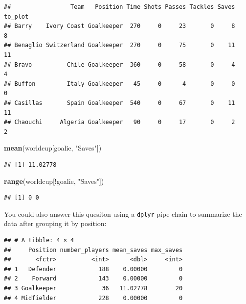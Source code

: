 \documentclass[]{book}
\makeatletter
\newenvironment{Shaded}{\begin{snugshade}}{\end{snugshade}}
\newcommand{\KeywordTok}[1]{\textcolor[rgb]{0.13,0.29,0.53}{\textbf{{#1}}}}
\newcommand{\DataTypeTok}[1]{\textcolor[rgb]{0.13,0.29,0.53}{{#1}}}
\newcommand{\StringTok}[1]{\textcolor[rgb]{0.31,0.60,0.02}{{#1}}}
\newcommand{\NormalTok}[1]{{#1}}
\newenvironment{kframe}{%
\medskip{}
\setlength{\fboxsep}{.8em}
 \def\at@end@of@kframe{}%
 \ifinner\ifhmode%
  \def\at@end@of@kframe{\end{minipage}}%
  \begin{minipage}{\columnwidth}%
 \fi\fi%
 \def\FrameCommand##1{\hskip\@totalleftmargin \hskip-\fboxsep
 \colorbox{shadecolor}{##1}\hskip-\fboxsep
     \hskip-\linewidth \hskip-\@totalleftmargin \hskip\columnwidth}%
 \MakeFramed {\advance\hsize-\width
   \@totalleftmargin\z@ \linewidth\hsize
   \@setminipage}}%
 {\par\unskip\endMakeFramed%
 \at@end@of@kframe}
\renewenvironment{Shaded}{\begin{kframe}}{\end{kframe}}
\makeatother
\begin{document}
\begin{verbatim}
##                 Team   Position Time Shots Passes Tackles Saves to_plot
## Barry    Ivory Coast Goalkeeper  270     0     23       0     8       8
## Benaglio Switzerland Goalkeeper  270     0     75       0    11      11
## Bravo          Chile Goalkeeper  360     0     58       0     4       4
## Buffon         Italy Goalkeeper   45     0      4       0     0       0
## Casillas       Spain Goalkeeper  540     0     67       0    11      11
## Chaouchi     Algeria Goalkeeper   90     0     17       0     2       2
\end{verbatim}

\begin{Shaded}
\begin{Highlighting}[]
\KeywordTok{mean}\NormalTok{(worldcup[goalie, }\StringTok{"Saves"}\NormalTok{])}
\end{Highlighting}
\end{Shaded}

\begin{verbatim}
## [1] 11.02778
\end{verbatim}

\begin{Shaded}
\begin{Highlighting}[]
\KeywordTok{range}\NormalTok{(worldcup[!goalie, }\StringTok{"Saves"}\NormalTok{])}
\end{Highlighting}
\end{Shaded}

\begin{verbatim}
## [1] 0 0
\end{verbatim}

You could also answer this quesiton using a \texttt{dplyr} pipe chain to
summarize the data after grouping it by position:

\begin{Shaded}
\end{Shaded}

\begin{verbatim}
## # A tibble: 4 × 4
##     Position number_players mean_saves max_saves
##       <fctr>          <int>      <dbl>     <int>
## 1   Defender            188    0.00000         0
## 2    Forward            143    0.00000         0
## 3 Goalkeeper             36   11.02778        20
## 4 Midfielder            228    0.00000         0
\end{verbatim}
\end{document}
